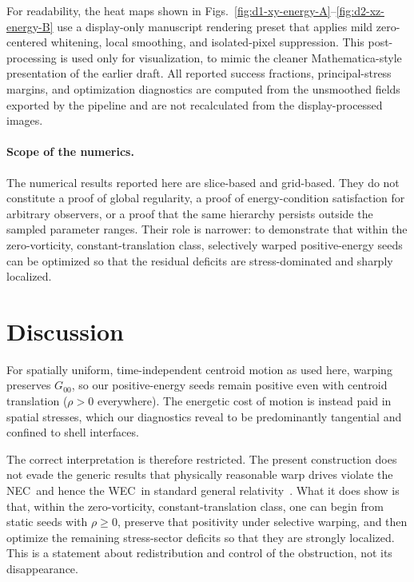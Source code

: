 \documentclass[11pt]{article}
\makeatletter
\newcommand{\@abbr}[1]{\ifmmode\mathrm{#1}\else\textsc{#1}\fi}
\newcommand{\WEC}{\@abbr{WEC}}
\newcommand{\NEC}{\@abbr{NEC}}
\makeatother
\begin{document}
For readability, the heat maps shown in Figs.~\ref{fig:d1-xy-energy-A}--\ref{fig:d2-xz-energy-B} use a display-only manuscript rendering preset that applies mild zero-centered whitening, local smoothing, and isolated-pixel suppression. This post-processing is used only for visualization, to mimic the cleaner Mathematica-style presentation of the earlier draft. All reported success fractions, principal-stress margins, and optimization diagnostics are computed from the unsmoothed fields exported by the pipeline and are not recalculated from the display-processed images.

\paragraph{Scope of the numerics.}
The numerical results reported here are slice-based and grid-based. They do not constitute a proof of global regularity, a proof of energy-condition satisfaction for arbitrary observers, or a proof that the same hierarchy persists outside the sampled parameter ranges. Their role is narrower: to demonstrate that within the zero-vorticity, constant-translation class, selectively warped positive-energy seeds can be optimized so that the residual deficits are stress-dominated and sharply localized.

\section{Discussion}
\label{sec:implications}
For spatially uniform, time-independent centroid motion as used here, warping preserves $G_{00}$, so our positive-energy seeds remain positive even with centroid translation ($\rho > 0$ everywhere). The energetic cost of motion is instead paid in spatial stresses, which our diagnostics reveal to be predominantly tangential and confined to shell interfaces.

The correct interpretation is therefore restricted. The present construction does not evade the generic results that physically reasonable warp drives violate the \NEC\ and hence the \WEC\ in standard general relativity~\cite{Olum:1998mu,Santiago:2021aup}. What it does show is that, within the zero-vorticity, constant-translation class, one can begin from static seeds with $\rho\ge 0$, preserve that positivity under selective warping, and then optimize the remaining stress-sector deficits so that they are strongly localized. This is a statement about redistribution and control of the obstruction, not its disappearance.
\end{document}
